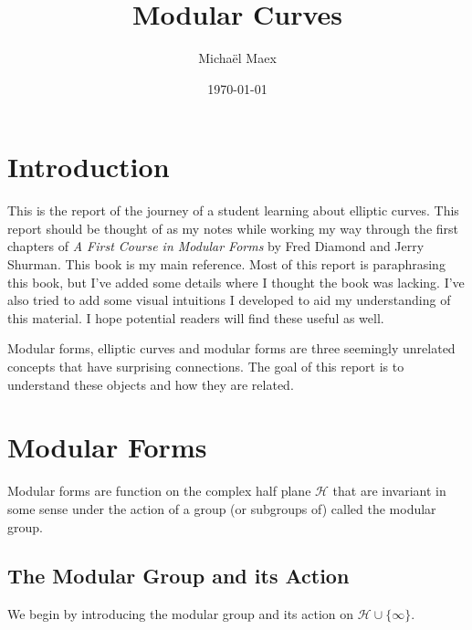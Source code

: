 \documentclass[a4paper]{article}
\author{Micha\"el Maex}
\date{\today}
\title{Modular Curves}
\theoremstyle{theoremdd}
\theoremstyle{definitiondd}
\theoremstyle{remarkdd}
\begin{document}
\maketitle

\bigskip

\tableofcontents

\pagebreak

\section{Introduction}

This is the report of the journey of a student learning about elliptic curves. 
This report should be thought of as my notes while working my way through the first chapters of \emph{A First Course in Modular Forms} by Fred Diamond and Jerry Shurman\cite{diamondFirstCourseModular2005a}. 
This book is my main reference. 
Most of this report is paraphrasing this book, but I've added some details where I thought the book was lacking. 
I've also tried to add some visual intuitions I developed to aid my understanding of this material. I hope potential readers will find these useful as well. 

Modular forms, elliptic curves and modular forms are three seemingly unrelated concepts that have surprising connections. 
The goal of this report is to understand these objects and how they are related. 

\section{Modular Forms}
Modular forms are function on the complex half plane $\mathcal{H} $ that are invariant in some sense under the action of a group (or subgroups of) called the modular group.

\subsection{The Modular Group and its Action}
We begin by introducing the modular group and its action on $\mathcal{H} \cup \{\infty\} $.  
\end{document}
